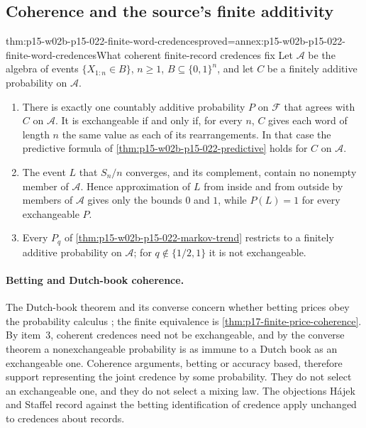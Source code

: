 \subsection{Coherence and the source's finite additivity}

\begin{hbtheorem}{thm:p15-w02b-p15-022-finite-word-credences}{proved=annex:p15-w02b-p15-022-finite-word-credences}{What coherent finite-record credences fix}
Let \(\mathcal A\) be the algebra of events \(\{X_{1:n}\in B\}\),
\(n\geq1\), \(B\subseteq\{0,1\}^n\), and let \(C\) be a finitely additive
probability on \(\mathcal A\).
\begin{enumerate}
\item There is exactly one countably additive probability \(P\) on
      \(\mathcal F\) that agrees with \(C\) on \(\mathcal A\). It is
      exchangeable if and only if, for every \(n\), \(C\) gives each word of
      length \(n\) the same value as each of its rearrangements. In that
      case the predictive formula of
      \cref{thm:p15-w02b-p15-022-predictive} holds for \(C\) on
      \(\mathcal A\).
\item The event \(L\) that \(S_n/n\) converges, and its complement, contain
      no nonempty member of \(\mathcal A\). Hence approximation of \(L\)
      from inside and from outside by members of \(\mathcal A\) gives only
      the bounds \(0\) and \(1\), while \(P(L)=1\) for every exchangeable
      \(P\).
\item Every \(P_q\) of \cref{thm:p15-w02b-p15-022-markov-trend} restricts
      to a finitely additive probability on \(\mathcal A\); for
      \(q\notin\{1/2,1\}\) it is not exchangeable.
\end{enumerate}
\end{hbtheorem}

\paragraph{Betting and Dutch-book coherence.}
The Dutch-book theorem and its converse concern whether betting prices obey
the probability calculus \cite[pp.~240--241]{HajekStaffel2021Dynamics}; the
finite equivalence is \cref{thm:p17-finite-price-coherence}. By item~3,
coherent credences need not be exchangeable, and by the converse theorem a
nonexchangeable probability is as immune to a Dutch book as an exchangeable
one. Coherence arguments, betting or accuracy based, therefore support
representing the joint credence by some probability. They do not select an
exchangeable one, and they do not select a mixing law. The objections H\'ajek
and Staffel record against the betting identification of credence apply
unchanged to credences about records.

